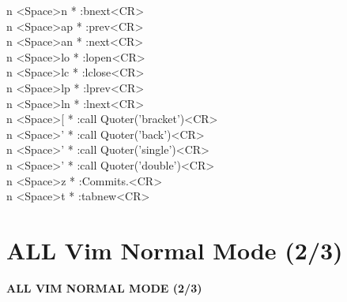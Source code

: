 \documentclass[11pt,a4paper,twoside]{book}
\begin{document}
n  <Space>n  * :bnext<CR>\\
n  <Space>ap  * :prev<CR>\\
n  <Space>an  * :next<CR>\\
n  <Space>lo  * :lopen<CR>\\
n  <Space>lc  * :lclose<CR>\\
n  <Space>lp  * :lprev<CR>\\
n  <Space>ln  * :lnext<CR>\\
n  <Space>[  * :call Quoter('bracket')<CR>\\
n  <Space>'  * :call Quoter('back')<CR>\\
n  <Space>'  * :call Quoter('single')<CR>\\
n  <Space>'  * :call Quoter('double')<CR>\\
n  <Space>z  * :Commits.<CR>\\
n  <Space>t  * :tabnew<CR>\\


\vspace{16pt}

\section{ALL Vim Normal Mode (2/3)}


\vspace{10pt}
{\large\bfseries\color{neoncyan} ALL VIM NORMAL MODE (2/3)}\vspace{6pt}
\end{document}
